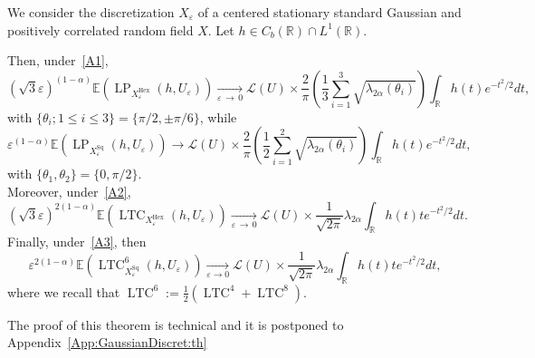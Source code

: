\documentclass[AHL,Unicode,longabstracts,published]{cedram}
\newcommand{\R}{\mathbb{R}}
\newcommand{\E}{\mathbb{E}}
\newcommand{\eps}{\varepsilon}
\DeclareMathOperator{\LTC}{LTC}
\DeclareMathOperator{\LP}{LP}
\DeclareMathOperator{\Hex}{Hex}
\DeclareMathOperator{\Sq}{Sq}
\newcommand{\calL}{\mathcal{L}}
\begin{document}
\begin{theo}\label{GaussianDiscret:th}
We consider the discretization $X_\eps$ of a centered stationary standard Gaussian and positively correlated random field $X$. Let $h \in C_b(\R)\cap L^1(\R)$.

\noindent Then, under~\eqref{A1},
\[
\left(\sqrt{3}\eps\right)^{(1-\alpha)}\E\left(\LP_{X_\eps^{\Hex}}(h,U_\eps)\right)\underset{\eps\,\rightarrow\,0}{\longrightarrow}{\calL}(U)\times \frac{2}{{\pi}}
\left(\frac{1}{3}\sum_{i=1}^3\sqrt{{\lambda_{{2\alpha}}(\theta_i)}}\right)\int_{\R}h(t)e^{-t^2/2}dt,
\]
with $\{\theta_i;1\le i\le 3\}=\{\pi/2,\pm\pi/6\}$, while
\[
\eps^{(1-\alpha)}\E\left(\LP_{X_\eps^{\Sq}}(h,U_\eps)\right)\longrightarrow
{\calL}(U)\times \frac{2}{{\pi}} \left(\frac{1}{2}\sum_{i=1}^2\sqrt{{\lambda_{{2\alpha}}(\theta_i)}}\right)\int_{\R}h(t)e^{-t^2/2}dt,
\]
with $\{\theta_1,\theta_2\}=\{0,\pi/2\}$.\\
Moreover, under~\eqref{A2},
\[
\left(\sqrt{3}\eps\right)^{2(1-\alpha)}\E\left(\LTC_{X_\eps^{\Hex}}(h,U_\eps)\right)\underset{\eps\,\rightarrow\,0}{\longrightarrow} {\calL}(U)\times\frac{1}{\sqrt{2\pi}}\lambda_{{2\alpha}}\int_{\R}h(t)te^{-t^2/2}dt.
\]
Finally, under~\eqref{A3}, then
\[
\eps^{2(1-\alpha)}\E\left(\LTC^6_{X_\eps^{\Sq}}(h,U_\eps)\right)\underset{\eps\rightarrow 0}{\longrightarrow} {\calL}(U)\times
\frac{1}{\sqrt{2\pi}}\lambda_{{2\alpha}}\int_{\R}h(t)te^{-t^2/2}dt,
\]
where we recall that $\LTC^6:=\frac{1}{2}(\LTC^4+ \LTC^8)$.
\end{theo}

The proof of this theorem is technical and it is postponed to Appendix~\ref{App:GaussianDiscret:th}
\end{document}
